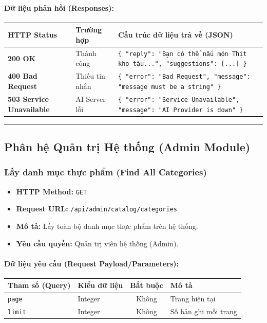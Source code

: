 \documentclass[12pt,a4paper]{article}
\begin{document}
\paragraph{Dữ liệu phản hồi (Responses):}
\begin{longtable}{|p{2.8cm}|p{3.2cm}|p{8.0cm}|}
\hline
\textbf{HTTP Status} & \textbf{Trường hợp} & \textbf{Cấu trúc dữ liệu trả về (JSON)} \\ \hline
\endhead
\textbf{200 OK} & Thành công & \texttt{\{ "reply": "Bạn có thể nấu món Thịt kho tàu...", "suggestions": [...] \}} \\ \hline
\textbf{400 Bad Request} & Thiếu tin nhắn & \texttt{\{ "error": "Bad Request", "message": "message must be a string" \}} \\ \hline
\textbf{503 Service Unavailable} & AI Server lỗi & \texttt{\{ "error": "Service Unavailable", "message": "AI Provider is down" \}} \\ \hline
\end{longtable}

\vskip 0.4cm
\noindent\rule{\textwidth}{0.3pt}
\vskip 0.4cm

\subsection{Phân hệ Quản trị Hệ thống (Admin Module)}

\subsubsection{Lấy danh mục thực phẩm (Find All Categories)}
\begin{itemize}[leftmargin=*]
    \item \textbf{HTTP Method:} \texttt{GET}
    \item \textbf{Request URL:} \texttt{/api/admin/catalog/categories}
    \item \textbf{Mô tả:} Lấy toàn bộ danh mục thực phẩm trên hệ thống.
    \item \textbf{Yêu cầu quyền:} Quản trị viên hệ thống (Admin).
\end{itemize}

\paragraph{Dữ liệu yêu cầu (Request Payload/Parameters):}
\begin{longtable}{|p{2.8cm}|p{2.2cm}|c|p{7.0cm}|}
\hline
\textbf{Tham số (Query)} & \textbf{Kiểu dữ liệu} & \textbf{Bắt buộc} & \textbf{Mô tả} \\ \hline
\endhead
\texttt{page} & Integer & Không & Trang hiện tại \\ \hline
\texttt{limit} & Integer & Không & Số bản ghi mỗi trang \\ \hline
\end{longtable}
\end{document}
